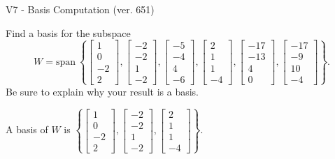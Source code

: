 \begin{exercise}
  \begin{exerciseTitle}V7 - Basis Computation (ver. 651)\end{exerciseTitle}
  \begin{exerciseStatement}
    Find a basis for the subspace 
\[W=\mathrm{span}\ \left\{\left[\begin{array}{r}
1 \\
0 \\
-2 \\
2
\end{array}\right] , \left[\begin{array}{r}
-2 \\
-2 \\
1 \\
-2
\end{array}\right] , \left[\begin{array}{r}
-5 \\
-4 \\
4 \\
-6
\end{array}\right] , \left[\begin{array}{r}
2 \\
1 \\
1 \\
-4
\end{array}\right] , \left[\begin{array}{r}
-17 \\
-13 \\
4 \\
0
\end{array}\right] , \left[\begin{array}{r}
-17 \\
-9 \\
10 \\
-4
\end{array}\right]\right\}.\]
 Be sure to explain why your result is a basis.


  \end{exerciseStatement}
  \begin{exerciseAnswer}
   A basis of \(W\) is  \(\left\{\left[\begin{array}{r}
1 \\
0 \\
-2 \\
2
\end{array}\right] , \left[\begin{array}{r}
-2 \\
-2 \\
1 \\
-2
\end{array}\right] , \left[\begin{array}{r}
2 \\
1 \\
1 \\
-4
\end{array}\right]\right\}\).
  


  \end{exerciseAnswer}
\end{exercise}